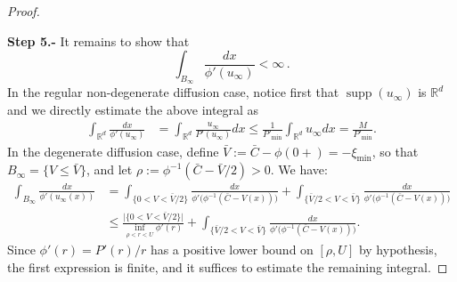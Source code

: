 \documentclass[reqno]{amsart}
\newcommand{\R}{\mathbb{R}}
\newcommand{\ximin}{\xi_{\text{min}}}
\newcommand{\uinf}{u_\infty}
\DeclareMathOperator{\supp}{supp}
\begin{document}
\begin{proof}
\
    
{\bf Step 5.-} It remains to show that 
    $$
    \int_{B_\infty}\frac{dx}{\phi'(\uinf)}<\infty\,.
    $$
In the regular non-degenerate diffusion case, notice first that $\supp(u_\infty)$ is $\R^d$ and we directly estimate the above integral as
    \begin{align*}
        \int_{\R^d}\frac{dx}{\phi'(u_\infty)}
        &= \int_{\R^d}\frac{\uinf}{P'(u_\infty)}dx\leq \frac1{P'_{\text{min}}}\int_{\R^d}\uinf dx=\frac{M}{P'_{\text{min}}}.
    \end{align*}
    In the degenerate diffusion case, define $\bar V:=\bar C-\phi(0+)=-\ximin$, so that $B_\infty=\{V\le\bar V\}$, and let $\rho:=\phi^{-1}(\bar C-\bar V/2)>0$. We have:
    \begin{align*}
        \int_{B_\infty}\frac{dx}{\phi'(u_\infty(x))}
        &= \int_{\{0<V<\bar V/2\}}\frac{dx}{\phi'\big(\phi^{-1}(\bar C-V(x))\big)}
        +\int_{\{\bar V/2< V<\bar V\}}\frac{dx}{\phi'\big(\phi^{-1}(\bar C-V(x))\big)}\\
        &\le \frac{\big|\{0<V<\bar V/2\}\big|}{\inf_{\rho<r< U}\phi'(r)}
        +\int_{\{\bar V/2< V<\bar V \}}\frac{dx}{\phi'\big(\phi^{-1}(\bar C-V(x))\big)}.
    \end{align*}
    Since $\phi'(r)=P'(r)/r$ has a positive lower bound on $[\rho, U]$ by hypothesis, the first expression is finite, and it suffices to estimate the remaining integral.


\end{proof}
\end{document}
